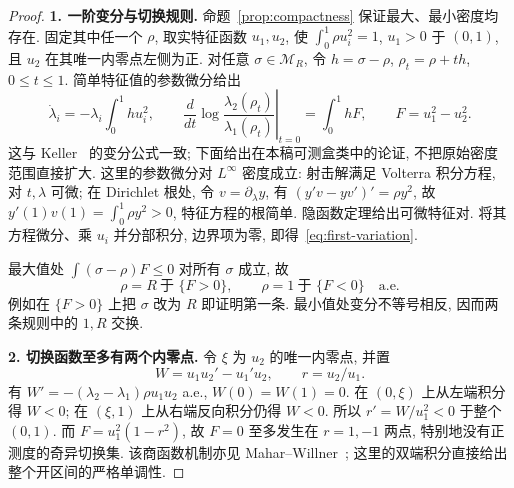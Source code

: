 \documentclass[UTF8]{ctexart}
\begin{document}
\begin{proof}
\textbf{1. 一阶变分与切换规则.}
命题~\ref{prop:compactness} 保证最大、最小密度均存在. 固定其中任一个 $\rho$,
取实特征函数 $u_1,u_2$, 使 $\int_0^1\rho u_i^2=1$, $u_1>0$ 于 $(0,1)$,
且 $u_2$ 在其唯一内零点左侧为正. 对任意 $\sigma\in\mathcal M_R$,
令 $h=\sigma-\rho$, $\rho_t=\rho+th$, $0\leq t\leq1$.
简单特征值的参数微分给出
\begin{equation}\label{eq:first-variation}
 \dot\lambda_i=-\lambda_i\int_0^1hu_i^2,
 \qquad \left.\frac{d}{dt}\log\frac{\lambda_2(\rho_t)}{\lambda_1(\rho_t)}\right|_{t=0}
 =\int_0^1hF,\qquad F=u_1^2-u_2^2.
\end{equation}
这与 Keller~\cite[pp.~486--487, (3.4)--(3.6)]{keller} 的变分公式一致;
下面给出在本稿可测盒类中的论证, 不把原始密度范围直接扩大.
这里的参数微分对 $L^\infty$ 密度成立: 射击解满足 Volterra 积分方程,
对 $t,\lambda$ 可微; 在 Dirichlet 根处, 令 $v=\partial_\lambda y$, 有
$(y'v-yv')'=\rho y^2$, 故
$y'(1)v(1)=\int_0^1\rho y^2>0$, 特征方程的根简单.
隐函数定理给出可微特征对. 将其方程微分、乘 $u_i$ 并分部积分,
边界项为零, 即得~\eqref{eq:first-variation}.

最大值处 $\int(\sigma-\rho)F\leq0$ 对所有 $\sigma$ 成立, 故
\begin{equation}\label{eq:switch-rule}
 \rho=R\ \text{于 }\{F>0\},\qquad \rho=1\ \text{于 }\{F<0\}\quad\text{a.e.}
\end{equation}
例如在 $\{F>0\}$ 上把 $\sigma$ 改为 $R$ 即证明第一条.
最小值处变分不等号相反, 因而两条规则中的 $1,R$ 交换.

\textbf{2. 切换函数至多有两个内零点.}
令 $\xi$ 为 $u_2$ 的唯一内零点, 并置
\[
 W=u_1u_2'-u_1'u_2,\qquad r=u_2/u_1.
\]
有 $W'=-(\lambda_2-\lambda_1)\rho u_1u_2$ a.e., $W(0)=W(1)=0$.
在 $(0,\xi)$ 上从左端积分得 $W<0$; 在 $(\xi,1)$ 上从右端反向积分仍得 $W<0$.
所以 $r'=W/u_1^2<0$ 于整个 $(0,1)$.
而 $F=u_1^2(1-r^2)$, 故 $F=0$ 至多发生在 $r=1,-1$ 两点,
特别地没有正测度的奇异切换集.
该商函数机制亦见 Mahar--Willner~\cite[pp.~526--527, Lemma 4,
(5.21)--(5.23)]{mw}; 这里的双端积分直接给出整个开区间的严格单调性.


\end{proof}
\end{document}
